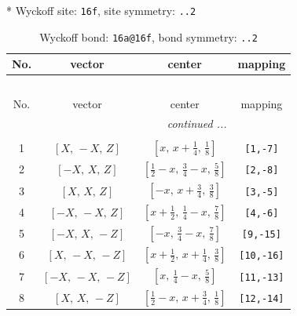 \documentclass[fleqn,8pt]{jsarticle}
\begin{document}
* Wyckoff site: {\tt 16f}, site symmetry: {\tt ..2}
\renewcommand{\arraystretch}{1.2}
\begin{longtable}{cccc}
\caption{Wyckoff bond: {\tt 16a@16f}, bond symmetry: {\tt ..2}}
 \\
 \hline \hline
No. & vector & center & mapping \\ \hline \endfirsthead

\multicolumn{3}{l}{\tablename\ \thetable{}} \\
 \hline \hline
No. & vector & center & mapping \\ \hline \endhead

 \hline \hline
\multicolumn{3}{r}{\footnotesize\it continued ...} \\ \endfoot

 \hline \hline
\multicolumn{3}{r}{} \\ \endlastfoot

1 & $\left[ X,\, - X,\, Z \right]$ & $\left[ x,\, x + \frac{1}{4},\, \frac{1}{8} \right]$ & {\tt [1,-7]} \\ \hline
2 & $\left[ - X,\, X,\, Z \right]$ & $\left[ \frac{1}{2} - x,\, \frac{3}{4} - x,\, \frac{5}{8} \right]$ & {\tt [2,-8]} \\ \hline
3 & $\left[ X,\, X,\, Z \right]$ & $\left[ - x,\, x + \frac{3}{4},\, \frac{3}{8} \right]$ & {\tt [3,-5]} \\ \hline
4 & $\left[ - X,\, - X,\, Z \right]$ & $\left[ x + \frac{1}{2},\, \frac{1}{4} - x,\, \frac{7}{8} \right]$ & {\tt [4,-6]} \\ \hline
5 & $\left[ - X,\, X,\, - Z \right]$ & $\left[ - x,\, \frac{3}{4} - x,\, \frac{7}{8} \right]$ & {\tt [9,-15]} \\ \hline
6 & $\left[ X,\, - X,\, - Z \right]$ & $\left[ x + \frac{1}{2},\, x + \frac{1}{4},\, \frac{3}{8} \right]$ & {\tt [10,-16]} \\ \hline
7 & $\left[ - X,\, - X,\, - Z \right]$ & $\left[ x,\, \frac{1}{4} - x,\, \frac{5}{8} \right]$ & {\tt [11,-13]} \\ \hline
8 & $\left[ X,\, X,\, - Z \right]$ & $\left[ \frac{1}{2} - x,\, x + \frac{3}{4},\, \frac{1}{8} \right]$ & {\tt [12,-14]} \\
\end{longtable}
\renewcommand{\arraystretch}{1.2}
\end{document}
